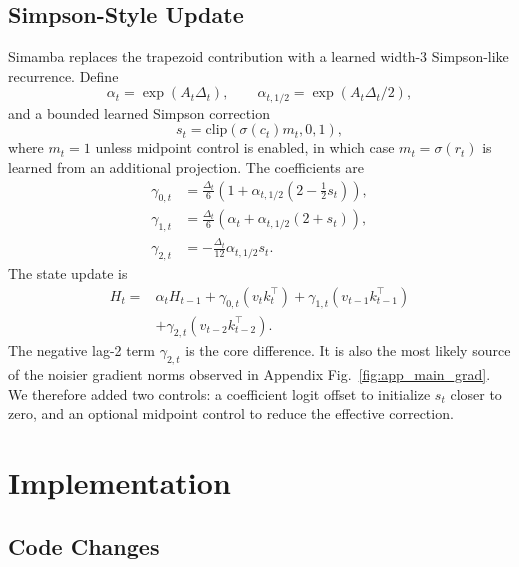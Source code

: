 \documentclass[conference]{IEEEtran}
\newcommand{\modelname}{Simamba\xspace}
\begin{document}
\subsection{Simpson-Style Update}

\modelname{} replaces the trapezoid contribution with a learned width-3 Simpson-like recurrence. Define
\begin{equation}
    \alpha_t = \exp(A_t\Delta_t), \qquad
    \alpha_{t,1/2} = \exp(A_t\Delta_t/2),
\end{equation}
and a bounded learned Simpson correction
\begin{equation}
    s_t = \mathrm{clip}(\sigma(c_t)m_t,0,1),
\end{equation}
where $m_t=1$ unless midpoint control is enabled, in which case $m_t=\sigma(r_t)$ is learned from an additional projection. The coefficients are
\begin{align}
    \gamma_{0,t} &= \frac{\Delta_t}{6}\left(1+\alpha_{t,1/2}(2-\frac{1}{2}s_t)\right),\\
    \gamma_{1,t} &= \frac{\Delta_t}{6}\left(\alpha_t+\alpha_{t,1/2}(2+s_t)\right),\\
    \gamma_{2,t} &= -\frac{\Delta_t}{12}\alpha_{t,1/2}s_t .
\end{align}
The state update is
\begin{equation}
\begin{split}
H_t ={}& \alpha_t H_{t-1}
    + \gamma_{0,t}(v_tk_t^\top)
    + \gamma_{1,t}(v_{t-1}k_{t-1}^\top)\\
    &+ \gamma_{2,t}(v_{t-2}k_{t-2}^\top).
\end{split}
\label{eq:simpson}
\end{equation}
The negative lag-2 term $\gamma_{2,t}$ is the core difference. It is also the most likely source of the noisier gradient norms observed in Appendix Fig.~\ref{fig:app_main_grad}. We therefore added two controls: a coefficient logit offset to initialize $s_t$ closer to zero, and an optional midpoint control to reduce the effective correction.

\section{Implementation}

\subsection{Code Changes}
\end{document}
